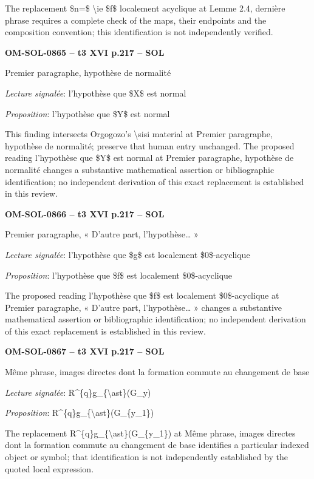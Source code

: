 The replacement \$n=\$ \textbackslash{}ie \$f\$ localement acyclique at Lemme 2.4, dernière phrase requires a complete check of the maps, their endpoints and the composition convention; this identification is not independently verified.\par
\par\noindent\textbf{OM-SOL-0865 -- t3 XVI p.217 -- SOL}\par
Premier paragraphe, hypothèse de normalité\par
\emph{Lecture signalée}: l'hypothèse que \$X\$ est normal\par
\emph{Proposition}: l'hypothèse que \$Y\$ est normal\par
This finding intersects Orgogozo's \textbackslash{}sisi material at Premier paragraphe, hypothèse de normalité; preserve that human entry unchanged. The proposed reading l'hypothèse que \$Y\$ est normal at Premier paragraphe, hypothèse de normalité changes a substantive mathematical assertion or bibliographic identification; no independent derivation of this exact replacement is established in this review.\par
\par\noindent\textbf{OM-SOL-0866 -- t3 XVI p.217 -- SOL}\par
Premier paragraphe, « D'autre part, l'hypothèse… »\par
\emph{Lecture signalée}: l'hypothèse que \$g\$ est localement \$0\$-acyclique\par
\emph{Proposition}: l'hypothèse que \$f\$ est localement \$0\$-acyclique\par
The proposed reading l'hypothèse que \$f\$ est localement \$0\$-acyclique at Premier paragraphe, « D'autre part, l'hypothèse… » changes a substantive mathematical assertion or bibliographic identification; no independent derivation of this exact replacement is established in this review.\par
\par\noindent\textbf{OM-SOL-0867 -- t3 XVI p.217 -- SOL}\par
Même phrase, images directes dont la formation commute au changement de base\par
\emph{Lecture signalée}: R\textasciicircum{}\{q\}g\_\{\textbackslash{}ast\}(G\_y)\par
\emph{Proposition}: R\textasciicircum{}\{q\}g\_\{\textbackslash{}ast\}(G\_\{y\_1\})\par
The replacement R\textasciicircum{}\{q\}g\_\{\textbackslash{}ast\}(G\_\{y\_1\}) at Même phrase, images directes dont la formation commute au changement de base identifies a particular indexed object or symbol; that identification is not independently established by the quoted local expression.\par
